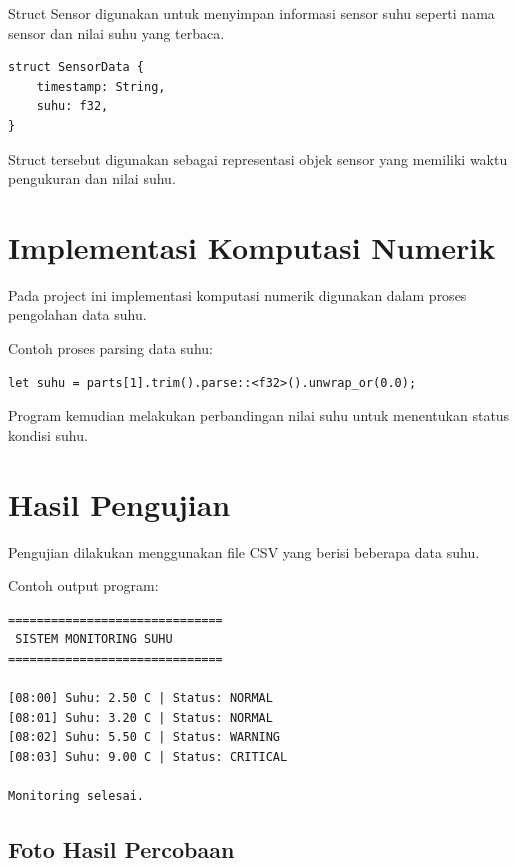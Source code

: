 \documentclass[a4paper,12pt]{article}
\begin{document}
Struct Sensor digunakan untuk menyimpan informasi sensor suhu seperti nama sensor dan nilai suhu yang terbaca.

\begin{verbatim}
struct SensorData {
    timestamp: String,
    suhu: f32,
}
\end{verbatim}

Struct tersebut digunakan sebagai representasi objek sensor yang memiliki waktu pengukuran dan nilai suhu.


\section{Implementasi Komputasi Numerik}

Pada project ini implementasi komputasi numerik digunakan dalam proses pengolahan data suhu.

Contoh proses parsing data suhu:

\begin{verbatim}
let suhu = parts[1].trim().parse::<f32>().unwrap_or(0.0);
\end{verbatim}

Program kemudian melakukan perbandingan nilai suhu untuk menentukan status kondisi suhu.


\section{Hasil Pengujian}

Pengujian dilakukan menggunakan file CSV yang berisi beberapa data suhu.

Contoh output program:

\begin{verbatim}
==============================
 SISTEM MONITORING SUHU
==============================

[08:00] Suhu: 2.50 C | Status: NORMAL
[08:01] Suhu: 3.20 C | Status: NORMAL
[08:02] Suhu: 5.50 C | Status: WARNING
[08:03] Suhu: 9.00 C | Status: CRITICAL

Monitoring selesai.
\end{verbatim}

\subsection{Foto Hasil Percobaan}
\end{document}
